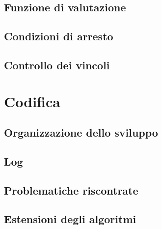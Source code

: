 \subsection{Funzione di valutazione}
\label{sec:funzione-valutazione}

\subsection{Condizioni di arresto}
\label{sec:condizioni-arresto}

\subsection{Controllo dei vincoli}
\label{sec:controllo-vincoli}

\section{Codifica}
\label{sec:codifica}

\subsection{Organizzazione dello sviluppo}
\label{sec:organizzazione-sviluppo}

\subsection{Log}
\label{sec:log}

\subsection{Problematiche riscontrate}
\label{sec:problematiche-riscontrate}

\subsection{Estensioni degli algoritmi}
\label{sec:estensioni-algoritmi}

